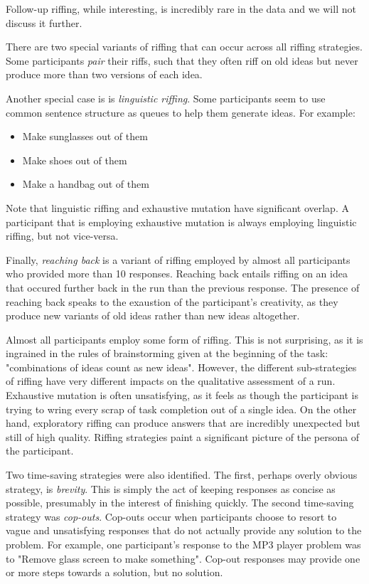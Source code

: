 Follow-up riffing, while interesting, is incredibly rare in the data and we will not discuss it further.

There are two special variants of riffing that can occur across all riffing strategies. Some participants \emph{pair} their riffs, such that they often riff on old ideas but never produce more than two versions of each idea.

Another special case is is \emph{linguistic riffing}. Some participants seem to use common sentence structure as queues to help them generate ideas. For example:

\begin{itemize}
    \item Make sunglasses out of them
    \item Make shoes out of them
    \item Make a handbag out of them
\end{itemize}

Note that linguistic riffing and exhaustive mutation have significant overlap. A participant that is employing exhaustive mutation is always employing linguistic riffing, but not vice-versa.

Finally, \emph{reaching back} is a variant of riffing employed by almost all participants who provided more than 10 responses. Reaching back entails riffing on an idea that occured further back in the run than the previous response. The presence of reaching back speaks to the exaustion of the participant's creativity, as they produce new variants of old ideas rather than new ideas altogether.

Almost all participants employ some form of riffing. This is not surprising, as it is ingrained in the rules of brainstorming given at the beginning of the task: "combinations of ideas count as new ideas". However, the different sub-strategies of riffing have very different impacts on the qualitative assessment of a run. Exhaustive mutation is often unsatisfying, as it feels as though the participant is trying to wring every scrap of task completion out of a single idea. On the other hand, exploratory riffing can produce answers that are incredibly unexpected but still of high quality. Riffing strategies paint a significant picture of the persona of the participant.

Two time-saving strategies were also identified. The first, perhaps overly obvious strategy, is \emph{brevity}. This is simply the act of keeping responses as concise as possible, presumably in the interest of finishing quickly. The second time-saving strategy was \emph{cop-outs}. Cop-outs occur when participants choose to resort to vague and unsatisfying responses that do not actually provide any solution to the problem. For example, one participant's response to the MP3 player problem was to "Remove glass screen to make something". Cop-out responses may provide one or more steps towards a solution, but no solution.



